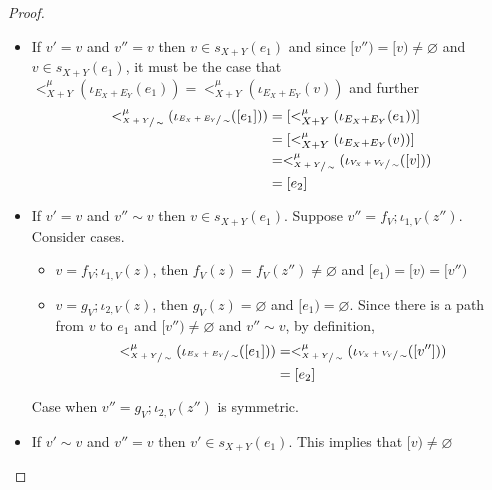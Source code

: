 \begin{proof}
\begin{itemize}
\begin{itemize}
                    \item If $v' = v$ and $v'' = v$ then $v \in s_{X+Y}(e_1)$ and since $[v'') = [v) \not = \varnothing$ and $v \in s_{X+Y}(e_1)$, it must be the case that
                    $<_{X+Y}^{\mu}(\iota_{E_{X} + E_{Y}}(e_1)) = <_{X+Y}^{\mu}(\iota_{E_{X} + E_{Y}}(v))$ and further
                    \begin{align*}
                    <_{\sfrac{X+Y}{\sim}}^{\mu}(\iota_{\sfrac{E_{X} + E_{Y}}{\sim}}([e_1])) &= [<_{X+Y}^{\mu}(\iota_{E_{X} + E_{Y}}(e_1))]\\
                                                                                            &= [<_{X+Y}^{\mu}(\iota_{E_{X} + E_{Y}}(v))]\\
                                                                                            &= <_{\sfrac{X+Y}{\sim}}^{\mu}(\iota_{\sfrac{V_{X} + V_{Y}}{\sim}}([v]))\\
                                                                                            &= [e_2]
                    \end{align*}
                    \item If $v' = v $ and $v'' \sim v$ then $v \in s_{X+Y}(e_1)$.
                          Suppose $v'' = f_{V};\iota_{1,V}(z'')$.
                          Consider cases.
                          \begin{itemize}
                            \item $v = f_{V};\iota_{1,V}(z)$, then $f_{V}(z) = f_{V}(z'') \not = \varnothing$ and $[e_1) = [v) = [v'')$
                            \item $v = g_{V};\iota_{2,V}(z)$, then $g_{V}(z) = \varnothing$ and $[e_1) = \varnothing$.
                                  Since there is a path from $v$ to $e_1$ and $[v'') \not = \varnothing$ and $v'' \sim v$, by definition,
                                  \begin{align*}
                                    <_{\sfrac{X+Y}{\sim}}^{\mu}(\iota_{\sfrac{E_{X} + E_{Y}}{\sim}}([e_1])) &= <_{\sfrac{X+Y}{\sim}}^{\mu}(\iota_{\sfrac{V_{X} + V_{Y}}{\sim}}([v'']))\\
                                    &= [e_2]
                                  \end{align*}
                          \end{itemize}
                          Case when $v'' = g_{V};\iota_{2,V}(z'')$ is symmetric.
                    \item If $v' \sim v$ and $v'' = v$ then $v' \in s_{X+Y}(e_1)$. This implies that $[v) \not = \varnothing$

\end{itemize}
\end{itemize}
\end{proof}

